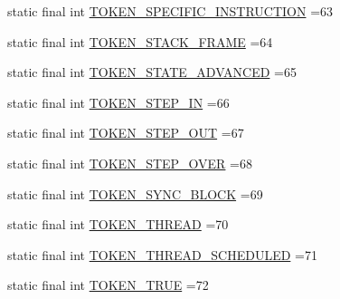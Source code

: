 \begin{DoxyCompactItemize}
\item 
static final int \hyperlink{classgov_1_1nasa_1_1jpf_1_1inspector_1_1server_1_1expression_1_1parser_1_1_expression_grammar_parser_ae953f0c3e17d835243c584843a9a7785}{T\+O\+K\+E\+N\+\_\+\+S\+P\+E\+C\+I\+F\+I\+C\+\_\+\+I\+N\+S\+T\+R\+U\+C\+T\+I\+ON} =63
\item 
static final int \hyperlink{classgov_1_1nasa_1_1jpf_1_1inspector_1_1server_1_1expression_1_1parser_1_1_expression_grammar_parser_a6e4b1bd2fea8f501c82401f37c935722}{T\+O\+K\+E\+N\+\_\+\+S\+T\+A\+C\+K\+\_\+\+F\+R\+A\+ME} =64
\item 
static final int \hyperlink{classgov_1_1nasa_1_1jpf_1_1inspector_1_1server_1_1expression_1_1parser_1_1_expression_grammar_parser_a108097811c29bbb98aad9334612a9440}{T\+O\+K\+E\+N\+\_\+\+S\+T\+A\+T\+E\+\_\+\+A\+D\+V\+A\+N\+C\+ED} =65
\item 
static final int \hyperlink{classgov_1_1nasa_1_1jpf_1_1inspector_1_1server_1_1expression_1_1parser_1_1_expression_grammar_parser_a8afeec7890e9281164353bd681b6c95d}{T\+O\+K\+E\+N\+\_\+\+S\+T\+E\+P\+\_\+\+IN} =66
\item 
static final int \hyperlink{classgov_1_1nasa_1_1jpf_1_1inspector_1_1server_1_1expression_1_1parser_1_1_expression_grammar_parser_a690f6125f221aa09663d428ff2692d6c}{T\+O\+K\+E\+N\+\_\+\+S\+T\+E\+P\+\_\+\+O\+UT} =67
\item 
static final int \hyperlink{classgov_1_1nasa_1_1jpf_1_1inspector_1_1server_1_1expression_1_1parser_1_1_expression_grammar_parser_ac0070e9751792113ed33b7a5cb870703}{T\+O\+K\+E\+N\+\_\+\+S\+T\+E\+P\+\_\+\+O\+V\+ER} =68
\item 
static final int \hyperlink{classgov_1_1nasa_1_1jpf_1_1inspector_1_1server_1_1expression_1_1parser_1_1_expression_grammar_parser_a15034a4c76c8bd5894f263564b8a3519}{T\+O\+K\+E\+N\+\_\+\+S\+Y\+N\+C\+\_\+\+B\+L\+O\+CK} =69
\item 
static final int \hyperlink{classgov_1_1nasa_1_1jpf_1_1inspector_1_1server_1_1expression_1_1parser_1_1_expression_grammar_parser_a006fe6f924167de5b73114a1dc2fbbe2}{T\+O\+K\+E\+N\+\_\+\+T\+H\+R\+E\+AD} =70
\item 
static final int \hyperlink{classgov_1_1nasa_1_1jpf_1_1inspector_1_1server_1_1expression_1_1parser_1_1_expression_grammar_parser_a9c256e22f168b6067ce463c0d624c023}{T\+O\+K\+E\+N\+\_\+\+T\+H\+R\+E\+A\+D\+\_\+\+S\+C\+H\+E\+D\+U\+L\+ED} =71
\item 
static final int \hyperlink{classgov_1_1nasa_1_1jpf_1_1inspector_1_1server_1_1expression_1_1parser_1_1_expression_grammar_parser_ae33cdae5be5688e7b11e1ed7cb749867}{T\+O\+K\+E\+N\+\_\+\+T\+R\+UE} =72

\end{DoxyCompactItemize}
